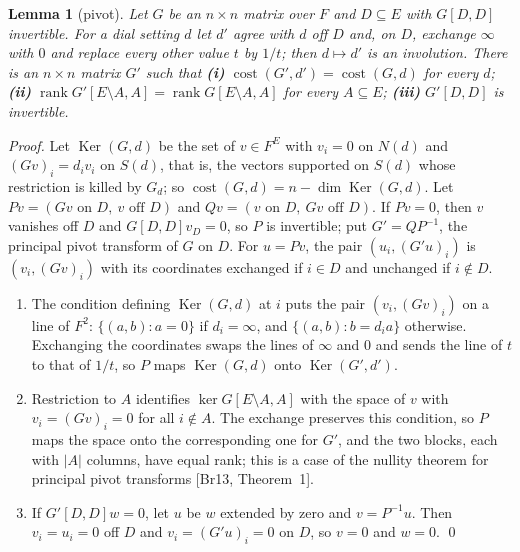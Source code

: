 \documentclass[11pt,letterpaper,reqno]{amsart}
\theoremstyle{spaced}
\newtheorem{lemma}{Lemma}
\begin{document}
\begin{lemma}[pivot]
Let \(G\) be an \(n \times n\) matrix over \(F\) and \(D \subseteq E\) with \(G[D, D]\) invertible. For a dial setting \(d\) let \(d'\) agree with \(d\) off \(D\) and, on \(D\), exchange \(\infty\) with \(0\) and replace every other value \(t\) by \(1/t\); then \(d \mapsto d'\) is an involution. There is an \(n \times n\) matrix \(G'\) such that \textbf{(i)} \(\operatorname{cost}(G', d') = \operatorname{cost}(G, d)\) for every \(d\); \textbf{(ii)} \(\operatorname{rank} G'[E \setminus A, A] = \operatorname{rank} G[E \setminus A, A]\) for every \(A \subseteq E\); \textbf{(iii)} \(G'[D, D]\) is invertible.
\end{lemma}

\emph{Proof.} Let \(\operatorname{Ker}(G, d)\) be the set of \(v \in F^E\) with \(v_i = 0\) on \(N(d)\) and \((Gv)_i = d_i v_i\) on \(S(d)\), that is, the vectors supported on \(S(d)\) whose restriction is killed by \(G_d\); so \(\operatorname{cost}(G, d) = n - \dim \operatorname{Ker}(G, d)\). Let \(Pv = (Gv \text{ on } D,\ v \text{ off } D)\) and \(Qv = (v \text{ on } D,\ Gv \text{ off } D)\). If \(Pv = 0\), then \(v\) vanishes off \(D\) and \(G[D, D] v_D = 0\), so \(P\) is invertible; put \(G' = Q P^{-1}\), the principal pivot transform of \(G\) on \(D\). For \(u = Pv\), the pair \((u_i, (G'u)_i)\) is \((v_i, (Gv)_i)\) with its coordinates exchanged if \(i \in D\) and unchanged if \(i \notin D\).

\begin{enumerate}
\def\labelenumi{(\roman{enumi})}
\item
  The condition defining \(\operatorname{Ker}(G, d)\) at \(i\) puts the pair \((v_i, (Gv)_i)\) on a line of \(F^2\): \(\{(a, b) : a = 0\}\) if \(d_i = \infty\), and \(\{(a, b) : b = d_i a\}\) otherwise. Exchanging the coordinates swaps the lines of \(\infty\) and \(0\) and sends the line of \(t\) to that of \(1/t\), so \(P\) maps \(\operatorname{Ker}(G, d)\) onto \(\operatorname{Ker}(G', d')\).
\item
  Restriction to \(A\) identifies \(\ker G[E \setminus A, A]\) with the space of \(v\) with \(v_i = (Gv)_i = 0\) for all \(i \notin A\). The exchange preserves this condition, so \(P\) maps the space onto the corresponding one for \(G'\), and the two blocks, each with \(\lvert A\rvert\) columns, have equal rank; this is a case of the nullity theorem for principal pivot transforms {[}Br13, Theorem~1{]}.
\item
  If \(G'[D, D] w = 0\), let \(u\) be \(w\) extended by zero and \(v = P^{-1} u\). Then \(v_i = u_i = 0\) off \(D\) and \(v_i = (G'u)_i = 0\) on \(D\), so \(v = 0\) and \(w = 0\). \qed
\end{enumerate}
\end{document}

